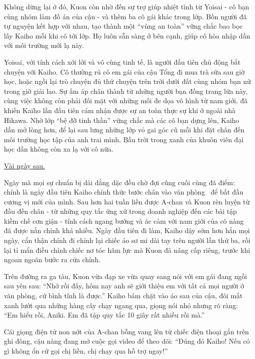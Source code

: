 \documentclass[../main.tex]{subfiles}
\begin{document}
Không dừng lại ở đó, Kuon còn nhờ đến sự trợ giúp nhiệt tình từ Yoisai - cô bạn cùng nhóm làm đồ án của cậu - và thêm ba cô gái khác trong lớp. Bốn người đã tự nguyện kết hợp với nhau, tạo thành một ``vùng an toàn'' vững chắc bao bọc lấy Kaiho mỗi khi cô tới lớp. Họ luôn sẵn sàng ở bên cạnh, giúp cô hòa nhập dần với môi trường mới lạ này.

Yoisai, với tính cách xởi lởi và vô cùng tinh tế, là người đầu tiên chủ động bắt chuyện với Kaiho. Cô thường rủ cô em gái của cậu Tổng đi mua trà sữa sau giờ học, hoặc ngồi lại trò chuyện đủ thứ chuyện trên trời dưới đất cùng nhóm bạn nữ trong giờ giải lao. Sự ấm áp chân thành từ những người bạn đồng trang lứa này, cùng việc không còn phải đối mặt với những mối đe dọa vô hình từ nam giới, đã khiến Kaiho lần đầu tiên cảm nhận được sự an toàn thực sự khi ở ngoài nhà Hikawa. Nhờ lớp ``bệ đỡ tinh thần'' vững chắc mà các cô bạn dựng lên, Kaiho dần mở lòng hơn, để lại sau lưng những lớp vỏ gai góc cũ mỗi khi đặt chân đến môi trường học tập của anh trai mình. Bầu trời trong xanh của khuôn viên đại học dần không còn xa lạ với cô nữa.

\begin{center}
    \uline{Vài ngày sau.}
\end{center}

Ngày mà mọi sự chuẩn bị dài dằng dặc đều chờ đợi cũng cuối cùng đã điểm: chính là ngày đầu tiên Kaiho chính thức bước chân vào văn phòng \hls\ để bắt đầu cương vị mới của mình. Sau hơn hai tuần liền được A-chan và Kuon rèn luyện từ đầu đến chân - từ những quy tắc ứng xử trong doanh nghiệp đến các bài tập kiềm chế cơn giận - tính cách ngang bướng và ác cảm với nam giới của cô nàng đã được nắn chỉnh khá nhiều. Ngày đầu tiên đi làm, Kaiho dậy sớm hơn hẳn mọi ngày, cẩn thận chỉnh đi chỉnh lại chiếc áo sơ mi dài tay trên người lần thứ ba, rồi lại tỉ mẩn điều chỉnh chiếc nơ tóc hãm lực mà Kuon đã nâng cấp riêng, trước khi ngoan ngoãn bước ra cửa chính.

Trên đường ra ga tàu, Kuon vừa đạp xe vừa quay sang nói với em gái đang ngồi sau yên sau: ``Nhớ rồi đấy, hôm nay anh sẽ giới thiệu em với tất cả mọi người ở văn phòng, cứ bình tĩnh là được.'' Kaiho bám chặt vào áo sau của cậu, đôi mắt xanh lướt qua những hàng cây chạy ngang qua, giọng nói nhỏ nhưng rõ ràng: ``Em hiểu rồi, Aniki. Em đã tập quy tắc 10 giây rất nhiều rồi mà.''

Cái giọng điện tử non nớt của A-chan bỗng vang lên từ chiếc điện thoại gắn trên ghi đông, cậu nàng đang mở cuộc gọi video để theo dõi: ``Đúng đó Kaiho! Nếu có gì không ổn cứ gọi chị liền, chị chạy qua hỗ trợ ngay!''
\end{document}
